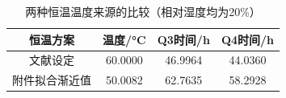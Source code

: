 \begin{table}[htbp]
  \centering
  \caption{两种恒温温度来源的比较（相对湿度均为20\%）}
  \label{tab:temperature-scenarios}
  \begin{tabular}{cccc}
    \toprule
    恒温方案 & 温度/°C & Q3时间/h & Q4时间/h \\
    \midrule
    文献设定 & 60.0000 & 46.9964 & 44.0360 \\
    附件拟合渐近值 & 50.0082 & 62.7635 & 58.2928 \\
    \bottomrule
  \end{tabular}
\end{table}
